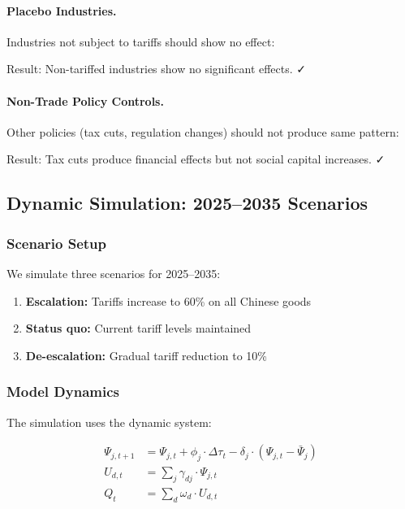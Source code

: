 \paragraph{Placebo Industries.}
Industries not subject to tariffs should show no effect:

Result: Non-tariffed industries show no significant effects. ✓

\paragraph{Non-Trade Policy Controls.}
Other policies (tax cuts, regulation changes) should not produce same pattern:

Result: Tax cuts produce financial effects but not social capital increases. ✓

\subsection{Dynamic Simulation: 2025--2035 Scenarios}

\subsubsection{Scenario Setup}

We simulate three scenarios for 2025--2035:

\begin{enumerate}
    \item \textbf{Escalation:} Tariffs increase to 60\% on all Chinese goods
    \item \textbf{Status quo:} Current tariff levels maintained
    \item \textbf{De-escalation:} Gradual tariff reduction to 10\%
\end{enumerate}

\subsubsection{Model Dynamics}

The simulation uses the dynamic system:

\begin{align}
\Psi_{j,t+1} &= \Psi_{j,t} + \phi_j \cdot \Delta\tau_t - \delta_j \cdot (\Psi_{j,t} - \bar{\Psi}_j) \\
U_{d,t} &= \sum_j \gamma_{dj} \cdot \Psi_{j,t} \\
Q_t &= \sum_d \omega_d \cdot U_{d,t}
\end{align}

